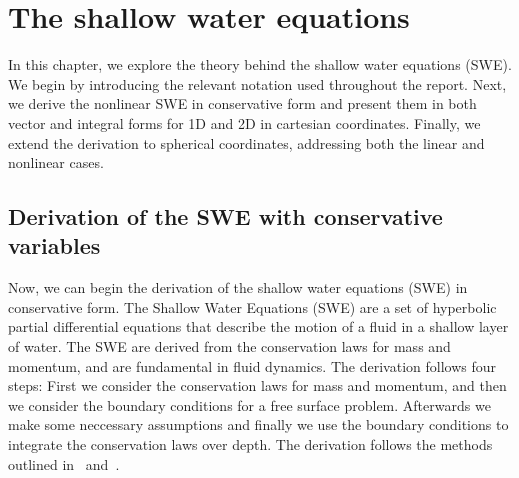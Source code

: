 \chapter{The shallow water equations}\label{ch:theory}
In this chapter, we explore the theory behind the shallow water equations (SWE).
We begin by introducing the relevant notation used throughout the report.
Next, we derive the nonlinear SWE in conservative form and present them in both vector and integral forms for 1D and 2D in cartesian coordinates.
Finally, we extend the derivation to spherical coordinates, addressing both the linear and nonlinear cases.



\section{Derivation of the SWE with conservative variables}
Now, we can begin the derivation of the shallow water equations (SWE) in conservative form.
The Shallow Water Equations (SWE) are a set of hyperbolic partial differential equations that describe the motion of a fluid in a shallow layer of water.
The SWE are derived from the conservation laws for mass and momentum, and are fundamental in fluid dynamics.
The derivation follows four steps: First we consider the conservation laws for mass and momentum, and then we consider the boundary conditions for a free surface problem.
Afterwards we make some neccessary assumptions and finally we use the boundary conditions to integrate the conservation laws over depth.
The derivation follows the methods outlined in~\cite{Toro2001-Shock} and~\cite{Vreugdenhil1994}.


